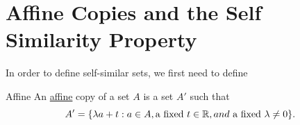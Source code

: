 \section{Affine Copies and the Self Similarity Property}
In order to define self-similar sets, we first need to define 
\begin{definition}{Affine}
    An \underline{affine} copy of a set $A$ is a set $A'$ such that $$A' = \{\lambda a + t : a \in A, \text{a fixed } t \in \mathbb{R}, and \text{ a fixed } \lambda \neq 0\}.$$
\end{definition}